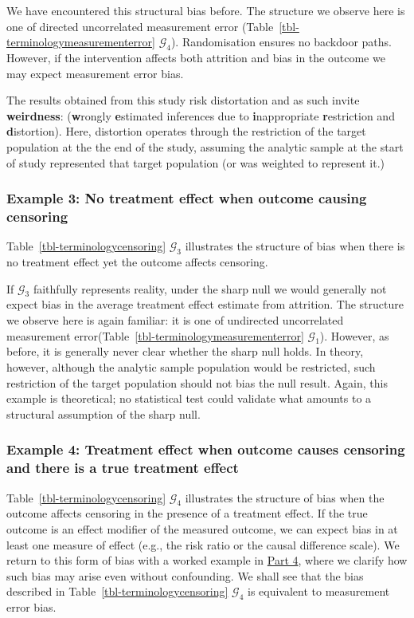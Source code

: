 \documentclass[
  single column]{article}
\begin{document}
We have encountered this structural bias before. The structure we
observe here is one of directed uncorrelated measurement error
(Table~\ref{tbl-terminologymeasurementerror} \(\mathcal{G}_4\)).
Randomisation ensures no backdoor paths. However, if the intervention
affects both attrition and bias in the outcome we may expect measurement
error bias.

The results obtained from this study risk distortation and as such
invite \textbf{weirdness}: (\textbf{w}rongly \textbf{e}stimated
inferences due to \textbf{i}nappropriate \textbf{r}estriction and
\textbf{d}istortion). Here, distortion operates through the restriction
of the target population at the the end of the study, assuming the
analytic sample at the start of study represented that target population
(or was weighted to represent it.)

\subsubsection{Example 3: No treatment effect when outcome causing
censoring}\label{example-3-no-treatment-effect-when-outcome-causing-censoring}

Table~\ref{tbl-terminologycensoring} \(\mathcal{G}_3\) illustrates the
structure of bias when there is no treatment effect yet the outcome
affects censoring.

If \(\mathcal{G}_3\) faithfully represents reality, under the sharp null
we would generally not expect bias in the average treatment effect
estimate from attrition. The structure we observe here is again
familiar: it is one of undirected uncorrelated measurement
error(Table~\ref{tbl-terminologymeasurementerror} \(\mathcal{G}_1\)).
However, as before, it is generally never clear whether the sharp null
holds. In theory, however, although the analytic sample population would
be restricted, such restriction of the target population should not bias
the null result. Again, this example is theoretical; no statistical test
could validate what amounts to a structural assumption of the sharp
null.

\subsubsection{Example 4: Treatment effect when outcome causes censoring
and there is a true treatment
effect}\label{example-4-treatment-effect-when-outcome-causes-censoring-and-there-is-a-true-treatment-effect}

Table~\ref{tbl-terminologycensoring} \(\mathcal{G}_4\) illustrates the
structure of bias when the outcome affects censoring in the presence of
a treatment effect. If the true outcome is an effect modifier of the
measured outcome, we can expect bias in at least one measure of effect
(e.g., the risk ratio or the causal difference scale). We return to this
form of bias with a worked example in \hyperref[id-sec-4]{Part 4}, where
we clarify how such bias may arise even without confounding. We shall
see that the bias described in Table~\ref{tbl-terminologycensoring}
\(\mathcal{G}_4\) is equivalent to measurement error bias.
\end{document}
